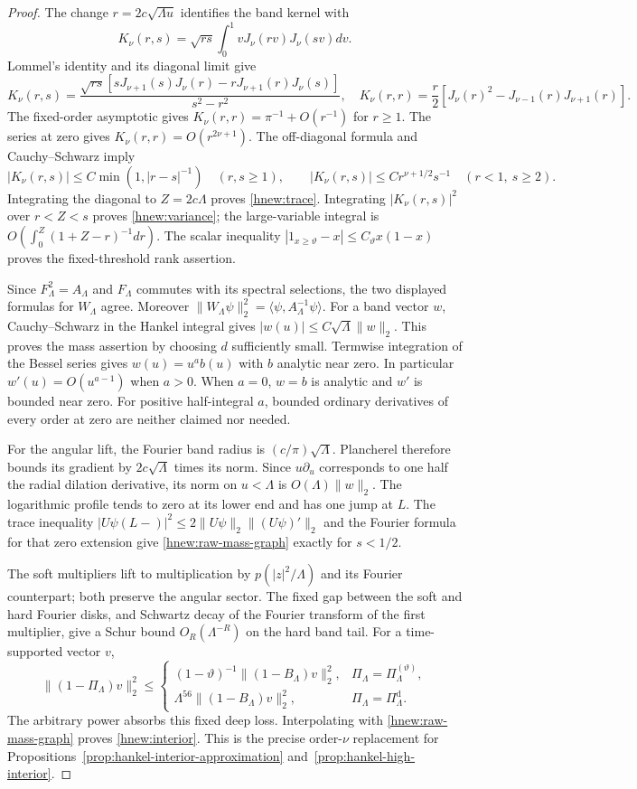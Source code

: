 \begin{proof}
The change $r=2c\sqrt{\Lambda u}$ identifies the band kernel with
\[
 K_\nu(r,s)=\sqrt{rs}\int_0^1vJ_\nu(rv)J_\nu(sv)dv.
\]
Lommel's identity and its diagonal limit give
\[
 K_\nu(r,s)=\frac{\sqrt{rs}
 [sJ_{\nu+1}(s)J_\nu(r)-rJ_{\nu+1}(r)J_\nu(s)]}{s^2-r^2},
 \quad
 K_\nu(r,r)=\frac r2[J_\nu(r)^2-J_{\nu-1}(r)J_{\nu+1}(r)].
\]
The fixed-order asymptotic gives $K_\nu(r,r)=\pi^{-1}+O(r^{-1})$
for $r\ge1$.  The series at zero gives $K_\nu(r,r)=O(r^{2\nu+1})$.
The off-diagonal formula and Cauchy--Schwarz imply
\[
 |K_\nu(r,s)|\le C\min(1,|r-s|^{-1})\quad(r,s\ge1),\qquad
 |K_\nu(r,s)|\le Cr^{\nu+1/2}s^{-1}\quad(r<1,\ s\ge2).
\]
Integrating the diagonal to $Z=2c\Lambda$ proves \eqref{hnew:trace}.
Integrating $|K_\nu(r,s)|^2$ over $r<Z<s$ proves
\eqref{hnew:variance}; the large-variable integral is
$O(\int_0^Z(1+Z-r)^{-1}dr)$.
The scalar inequality
$|1_{x\ge\vartheta}-x|\le C_\vartheta x(1-x)$ proves the
fixed-threshold rank assertion.

Since $F_\Lambda^2=A_\Lambda$ and $F_\Lambda$ commutes with its
spectral selections, the two displayed formulas for $W_\Lambda$
agree.  Moreover
$\|W_\Lambda\psi\|_2^2=\langle\psi,A_\Lambda^{-1}\psi\rangle$.
For a band vector $w$, Cauchy--Schwarz in the Hankel integral gives
$|w(u)|\le C\sqrt\Lambda\|w\|_2$.  This proves the mass assertion
by choosing $d$ sufficiently small.  Termwise integration of the
Bessel series gives $w(u)=u^ab(u)$ with $b$ analytic near zero.
In particular $w'(u)=O(u^{a-1})$ when $a>0$.
When $a=0$, $w=b$ is analytic and $w'$ is bounded near zero.
For positive half-integral $a$, bounded ordinary derivatives of
every order at zero are neither claimed nor needed.

For the angular lift, the Fourier band radius is
$(c/\pi)\sqrt\Lambda$.  Plancherel therefore bounds its gradient
by $2c\sqrt\Lambda$ times its norm.  Since $u\partial_u$
corresponds to one half the radial dilation derivative, its norm
on $u<\Lambda$ is $O(\Lambda)\|w\|_2$.
The logarithmic profile tends to zero at its lower end and has
one jump at $L$.  The trace inequality
$|U\psi(L-)|^2\le2\|U\psi\|_2\|(U\psi)'\|_2$ and the Fourier
formula for that zero extension give \eqref{hnew:raw-mass-graph}
exactly for $s<1/2$.

The soft multipliers lift to multiplication by $p(|z|^2/\Lambda)$
and its Fourier counterpart; both preserve the angular sector.
The fixed gap between the soft and hard Fourier disks, and
Schwartz decay of the Fourier transform of the first multiplier,
give a Schur bound $O_R(\Lambda^{-R})$ on the hard band tail.
For a time-supported vector $v$,
\[
 \|(1-\Pi_\Lambda)v\|_2^2
 \le\begin{cases}
 (1-\vartheta)^{-1}\|(1-B_\Lambda)v\|_2^2,
       &\Pi_\Lambda=\Pi_\Lambda^{(\vartheta)},\\
 \Lambda^{56}\|(1-B_\Lambda)v\|_2^2,
       &\Pi_\Lambda=\Pi_\Lambda^{\mathrm d}.
 \end{cases}
\]
The arbitrary power absorbs this fixed deep loss.  Interpolating
with \eqref{hnew:raw-mass-graph} proves \eqref{hnew:interior}.
This is the precise order-$\nu$ replacement for
Propositions~\ref{prop:hankel-interior-approximation}
and~\ref{prop:hankel-high-interior}.


\end{proof}
